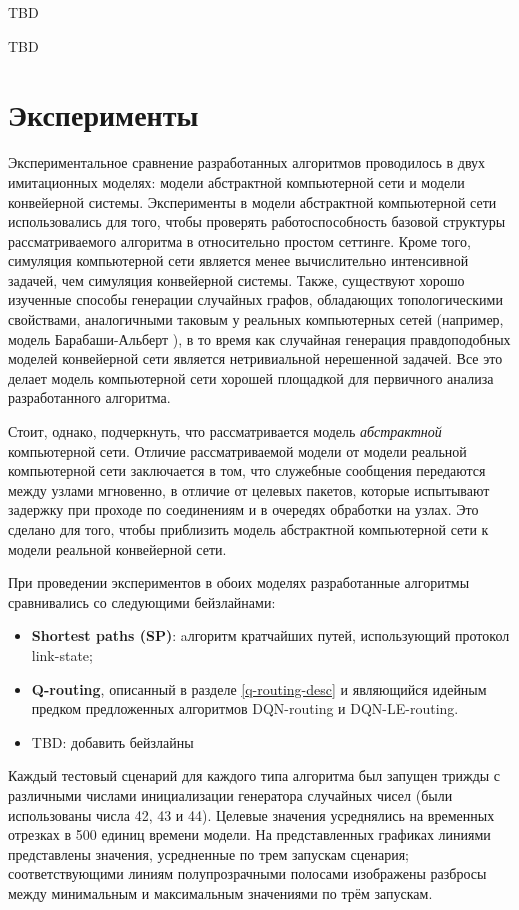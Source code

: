 \documentclass[specification,annotation,times]{itmo-student-thesis}
\theoremstyle{definition}
\begin{document}
TBD

\chapterconclusion

TBD

\chapter{Эксперименты}\label{experiments}

Экспериментальное сравнение разработанных алгоритмов проводилось в двух
имитационных моделях: модели абстрактной компьютерной сети и модели конвейерной
системы. Эксперименты в модели абстрактной компьютерной сети использовались для
того, чтобы проверять работоспособность базовой структуры рассматриваемого
алгоритма в относительно простом сеттинге. Кроме того, симуляция компьютерной
сети является менее вычислительно интенсивной задачей, чем симуляция конвейерной
системы. Также, существуют хорошо изученные способы генерации случайных графов,
обладающих топологическими свойствами, аналогичными таковым у реальных
компьютерных сетей (например, модель Барабаши-Альберт
\cite{albert2002statistical}), в то время как случайная генерация правдоподобных
моделей конвейерной сети является нетривиальной нерешенной задачей. Все это
делает модель компьютерной сети хорошей площадкой для первичного анализа
разработанного алгоритма.

Стоит, однако, подчеркнуть, что рассматривается модель \textit{абстрактной}
компьютерной сети. Отличие рассматриваемой модели от модели реальной
компьютерной сети заключается в том, что служебные сообщения передаются между
узлами мгновенно, в отличие от целевых пакетов, которые испытывают задержку при
проходе по соединениям и в очередях обработки на узлах. Это сделано для того,
чтобы приблизить модель абстрактной компьютерной сети к модели реальной
конвейерной сети.

При проведении экспериментов в обоих моделях разработанные алгоритмы
сравнивались со следующими бейзлайнами:
\begin{itemize}
  \item \textbf{Shortest paths (SP)}: aлгоритм кратчайших путей, использующий протокол link-state; 
  \item \textbf{Q-routing}, описанный в разделе \ref{q-routing-desc} и
    являющийся идейным предком предложенных алгоритмов DQN-routing и DQN-LE-routing.
  \item TBD: добавить бейзлайны
\end{itemize}

Каждый тестовый сценарий для каждого типа алгоритма был запущен трижды с
различными числами инициализации генератора случайных чисел (были использованы
числа 42, 43 и 44). Целевые значения усреднялись на временных отрезках в 500
единиц времени модели. На представленных графиках линиями представлены значения,
усредненные по трем запускам сценария; соответствующими линиям полупрозрачными
полосами изображены разбросы между минимальным и максимальным значениями по трём
запускам.
\end{document}
